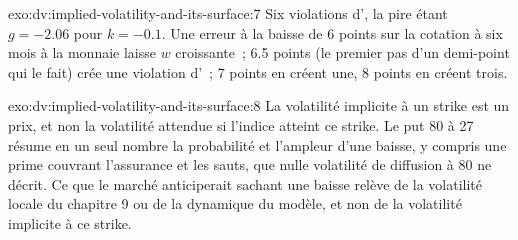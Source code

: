 \begin{solution}{exo:dv:implied-volatility-and-its-surface:7}
Six violations d', la pire étant $g=-2.06$ pour $k=-0.1$. Une erreur à la baisse de 6 points sur
la cotation à six mois à la monnaie laisse $w$ croissante~; 6.5 points (le premier pas
d'un demi-point qui le fait) crée une violation d'~; 7 points en créent une, 8 points en créent trois.
\end{solution}

\begin{solution}{exo:dv:implied-volatility-and-its-surface:8}
La volatilité implicite à un strike est un prix, et non la volatilité attendue si l'indice atteint ce
strike. Le put 80 à 27 résume en un seul nombre la probabilité et l'ampleur d'une baisse, y compris
une prime couvrant l'assurance et les sauts, que nulle volatilité de diffusion à 80 ne décrit. Ce que le
marché anticiperait sachant une baisse relève de la volatilité locale du chapitre 9 ou de la
dynamique du modèle, et non de la volatilité implicite à ce strike.
\end{solution}


